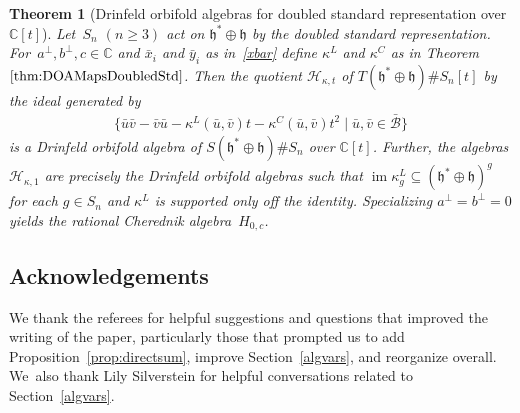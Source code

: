 \documentclass[10pt,a4paper]{amsart}
\numberwithin{equation}{section}
\newtheorem{Theorem}{Theorem}[section]
\DeclareMathOperator{\im}{im}
\begin{document}
\begin{Theorem}[{Drinfeld orbifold algebras for doubled standard representation over $\mathbb{C}[t]$}]\label{refexamples}
Let~$S_n$ $(n \geq 3)$ act on $\mathfrak{h}^* \oplus \mathfrak{h}$
by the doubled standard representation. For~$a^\perp,b^\perp,c \in \mathbb{C}$ and
$\bar{x}_i$ and $\bar{y}_i$ as in~\eqref{xbar} define
$\kappa^L$ and $\kappa^C$ as in Theorem~$\ref{thm:DOAMapsDoubledStd}$.
Then the quotient $\mathcal{H}_{\kappa,t}$ of $T(\mathfrak{h}^* \oplus \mathfrak{h}) \# S_n[t]$ by the ideal generated
by
\begin{gather*}
\big\{\bar{u}\bar{v}-\bar{v}\bar{u}-\kappa^L(\bar{u},\bar{v})t-\kappa^C(\bar{u},\bar{v})t^2 \mid \bar{u}, \bar{v} \in \bar{\mathcal{B}}\big\}
\end{gather*}
is a Drinfeld orbifold algebra of $S(\mathfrak{h}^* \oplus \mathfrak{h})\# S_n$ over $\mathbb{C}[t]$.
Further, the algebras $\mathcal{H}_{\kappa,1}$ are precisely the Drinfeld orbifold
algebras such that $\im\kappa^L_g\subseteq (\mathfrak{h}^*\oplus \mathfrak{h})^g$ for each $g\in S_n$ and $\kappa^L$
is supported only off the identity.
Specializing $a^\perp=b^\perp=0$ yields the rational Cherednik algebra~$H_{0,c}$.
\end{Theorem}

\subsection*{Acknowledgements}
We thank the referees for helpful suggestions and questions that improved the writing of the paper, particularly those that prompted us to add Proposition~\ref{prop:directsum}, improve Section~\ref{algvars}, and reorganize overall. We~also thank Lily Silverstein for helpful conversations related to Section~\ref{algvars}.

\end{document}
